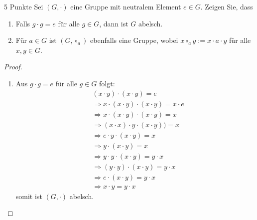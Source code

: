 \documentclass{problemset}
\begin{document}
\begin{problem} {5 Punkte}
Sei $(G, \cdot)$ eine Gruppe mit neutralem Element $e \in G$. Zeigen Sie, dass
\begin{enumerate}
    \item Falls $g \cdot g = e$ für alle $g \in G$, dann ist $G$ abelsch.
    \item Für $a \in G$ ist $(G, \circ_a)$ ebenfalls eine Gruppe, wobei $x
          \circ_a y := x \cdot a \cdot y$ für alle $x, y \in G$.
\end{enumerate}
\begin{proof}
    $ $

    \begin{enumerate}
        \item Aus $g \cdot g = e$ für alle $g \in G$ folgt:
              \begin{align*}
                   & (x \cdot y) \cdot (x \cdot y) = e \tag{$x \cdot y \in G \Longrightarrow \exists g \in G: g \cdot g = e$} \\
                   & \Longrightarrow x \cdot (x \cdot y) \cdot (x \cdot y) = x \cdot e                                        \\
                   & \Longrightarrow x \cdot (x \cdot y) \cdot (x \cdot y) = x                                                \\
                   & \Longrightarrow (x \cdot x) \cdot y \cdot (x \cdot y)) = x                                               \\
                   & \Longrightarrow e \cdot y \cdot (x \cdot y) = x                                                          \\
                   & \Longrightarrow y \cdot (x \cdot y) = x                                                                  \\
                   & \Longrightarrow y \cdot y \cdot (x \cdot y) = y \cdot x                                                  \\
                   & \Longrightarrow (y \cdot y) \cdot (x \cdot y) = y \cdot x                                                \\
                   & \Longrightarrow e \cdot (x \cdot y) = y \cdot x                                                          \\
                   & \Longrightarrow x \cdot y = y \cdot x
              \end{align*}
              somit ist $(G, \cdot)$ abelsch. \checkmark


\end{enumerate}
\end{proof}
\end{problem}
\end{document}
